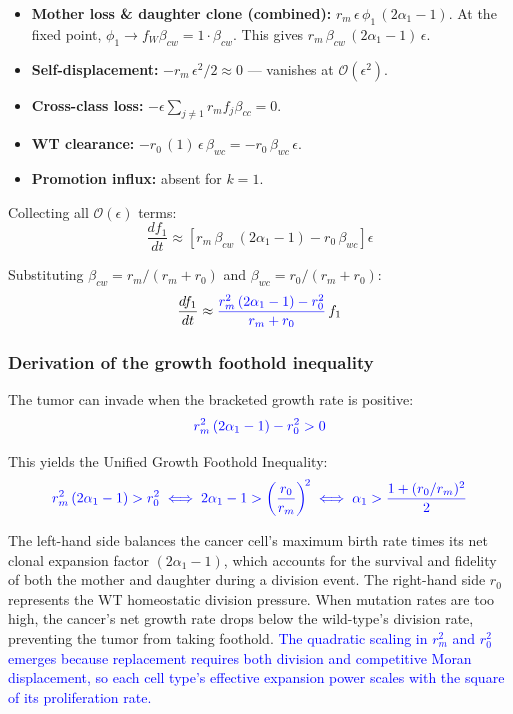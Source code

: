 \documentclass[11pt,a4paper]{article}
\newcommand{\rev}[1]{\textcolor{blue}{#1}}
\begin{document}
\begin{itemize}
    \item \textbf{Mother loss \& daughter clone (combined):} $r_m\,\epsilon\,\phi_1\,(2\alpha_1 - 1)$. At the fixed point, $\phi_1 \to f_W \beta_{cw} = 1 \cdot \beta_{cw}$. This gives $r_m\,\beta_{cw}\,(2\alpha_1 - 1)\,\epsilon$.
    \item \textbf{Self-displacement:} $-r_m\,\epsilon^2/2 \approx 0$ --- vanishes at $\mathcal{O}(\epsilon^2)$.
    \item \textbf{Cross-class loss:} $-\epsilon \sum_{j\neq 1} r_m f_j \beta_{cc} = 0$.
    \item \textbf{WT clearance:} $-r_0\,(1)\,\epsilon\,\beta_{wc} = -r_0\,\beta_{wc}\,\epsilon$.
    \item \textbf{Promotion influx:} absent for $k=1$.
\end{itemize}

Collecting all $\mathcal{O}(\epsilon)$ terms:
\begin{equation}
    \frac{df_1}{dt} \approx \left[ r_m\,\beta_{cw}\,(2\alpha_1 - 1) - r_0\,\beta_{wc} \right] \epsilon
\end{equation}

Substituting $\beta_{cw} = r_m/(r_m + r_0)$ and $\beta_{wc} = r_0/(r_m + r_0)$:
\begin{equation}
    \frac{df_1}{dt} \approx \rev{\frac{r_m^2\,(2\alpha_1 - 1) - r_0^2}{r_m + r_0}} \, f_1
\end{equation}

\subsubsection*{Derivation of the growth foothold inequality}

The tumor can invade when the bracketed growth rate is positive:
\begin{equation}
    \rev{r_m^2\,(2\alpha_1 - 1) - r_0^2 > 0}
\end{equation}

This yields the Unified Growth Foothold Inequality:
\begin{equation}
    \rev{r_m^2\,(2\alpha_1 - 1) > r_0^2 \iff 2\alpha_1 - 1 > \left(\frac{r_0}{r_m}\right)^{\!2} \iff \alpha_1 > \frac{1 + (r_0/r_m)^2}{2}}
\end{equation}

The left-hand side balances the cancer cell's maximum birth rate times its net clonal expansion factor $(2\alpha_1 - 1)$, which accounts for the survival and fidelity of both the mother and daughter during a division event. The right-hand side $r_0$ represents the WT homeostatic division pressure. When mutation rates are too high, the cancer's net growth rate drops below the wild-type's division rate, preventing the tumor from taking foothold. \rev{The quadratic scaling in $r_m^2$ and $r_0^2$ emerges because replacement requires both division and competitive Moran displacement, so each cell type's effective expansion power scales with the square of its proliferation rate.}
\end{document}
